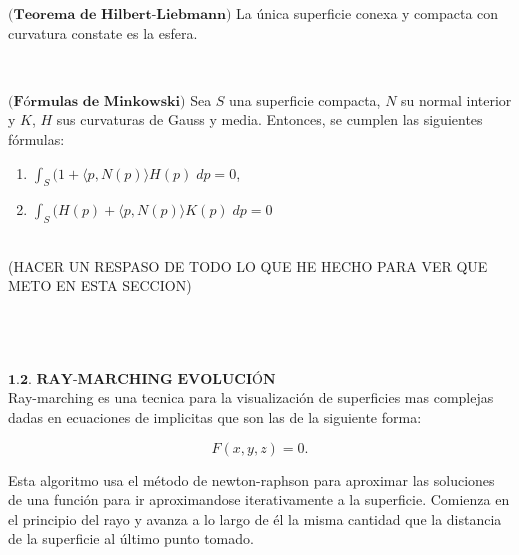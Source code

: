\begin{teorema} \label{teo:hil-lie}
	$\textbf{(Teorema de Hilbert-Liebmann)}$ La única superficie conexa y compacta con curvatura constate es la esfera.
\end{teorema}
${ }$\\


\begin{teorema}
	$\textbf{(Fórmulas de Minkowski)}$ Sea $S$ una superficie compacta, $N$ su normal interior y $K$, $H$ sus curvaturas de Gauss y media. Entonces, se cumplen las siguientes fórmulas:
	\begin{enumerate}
		\item $\int_S (1 + \langle p, N(p) \rangle H(p) \; dp = 0$,
		\item $\int_S (H(p) + \langle p, N(p) \rangle K(p) \; dp = 0$
	\end{enumerate}
\end{teorema}
${ }$\\


(HACER UN RESPASO DE TODO LO QUE HE HECHO PARA VER QUE METO EN ESTA SECCION)


${ }$\\
${ }$\\
${ }$\\
$\textbf{1.2. RAY-MARCHING EVOLUCIÓN}$
${ }$\\

Ray-marching es una tecnica para la visualización de superficies mas complejas dadas en ecuaciones de implicitas que son las de la siguiente forma:

\[
F(x,y,z) = 0.
\]

Esta algoritmo usa el método de newton-raphson para aproximar las soluciones de una función para ir aproximandose iterativamente a la superficie. Comienza en el principio del rayo y avanza a lo largo de él la misma cantidad que la distancia de la superficie al último punto tomado.